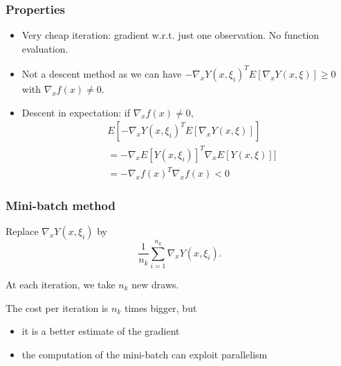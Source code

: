 \documentclass{beamer}
\begin{document}
\begin{frame}
\frametitle{Properties}

\begin{itemize}
\item 
Very cheap iteration: gradient w.r.t. just one observation. No function evaluation.
\item
Not a descent method as we can have $-\nabla_x Y(x,\xi_i)^T E[\nabla_x Y(x,\xi)] \geq 0$ with $\nabla_x f(x) \ne 0$.
\item
Descent in expectation: if $\nabla_x f(x) \ne 0$,
\begin{align*}
& E[-\nabla_x Y(x,\xi_i)^T E[\nabla_x Y(x,\xi)]] \\
&= - \nabla_x E[Y(x,\xi_i)]^T \nabla_x E[Y(x,\xi)]] \\
&= - \nabla_x f(x)^T\nabla_x f(x) < 0
\end{align*}
\end{itemize}



\end{frame}

\begin{frame}
\frametitle{Mini-batch method}

Replace $\nabla_x Y(x,\xi_i)$ by
$$
\frac{1}{n_k} \sum_{i = 1}^{n_k} \nabla_x Y(x,\xi_i).
$$

\mbox{}

At each iteration, we take $n_k$ new draws.

\mbox{}

The cost per iteration is $n_k$ times bigger, but
\begin{itemize}
	\item it is a better estimate of the gradient
	\item the computation of the mini-batch can exploit parallelism
\end{itemize}

\end{frame}
\end{document}

